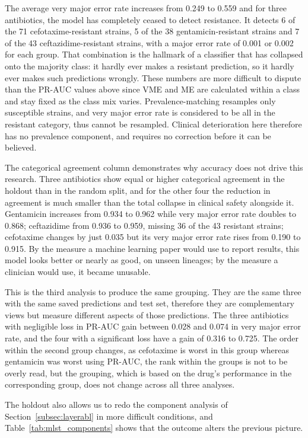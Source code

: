 The average very major error rate increases from 0.249 to 0.559 and for three
antibiotics, the model has completely ceased to detect resistance. It detects
6 of the 71 cefotaxime-resistant strains, 5 of the 38
gentamicin-resistant strains and 7 of the 43 ceftazidime-resistant strains, with a
major error rate of 0.001 or 0.002 for each group. That combination is the
hallmark of a classifier that has collapsed onto the
majority class: it hardly ever makes a resistant prediction, so it hardly ever
makes such predictions wrongly. These numbers are more difficult to dispute
than the PR-AUC values above since VME and ME are calculated within a class and
stay fixed as the class mix varies. Prevalence-matching resamples only
susceptible strains, and very major error rate is considered to be all in the
resistant category, thus cannot be resampled. Clinical deterioration here
therefore has no prevalence component, and requires no correction before it can
be believed.

The categorical agreement column demonstrates why accuracy does not drive this
research. Three antibiotics show equal or higher categorical agreement in the
holdout than in the random split, and for the other four the reduction in
agreement is much smaller than the total collapse in clinical safety alongside
it. Gentamicin increases from 0.934 to 0.962 while very major error rate doubles
to 0.868; ceftazidime from 0.936 to 0.959, missing 36 of the 43 resistant
strains; cefotaxime changes by just 0.035 but its very major error rate rises from
0.190 to 0.915. By the measure a machine learning paper would use to report
results, this model looks better or nearly as good, on unseen lineages; by the
measure a clinician would use, it became unusable.

This is the third analysis to produce the same grouping. They are the same three
with the same saved predictions and test set, therefore they are complementary
views but measure different aspects of those predictions. The three antibiotics
with negligible loss in PR-AUC gain between 0.028 and 0.074 in very major error
rate, and the four with a significant loss have a gain of 0.316 to 0.725. The
order within the second group changes, as cefotaxime is worst in this group
whereas gentamicin was worst using PR-AUC, the rank within the groups is not to be
overly read, but the grouping, which is based on the drug's performance in the
corresponding group, does not change across all three analyses.

The holdout also allows us to redo the component analysis of
Section~\ref{subsec:layerabl} in more difficult conditions, and
Table~\ref{tab:mlst_components} shows that the outcome alters the previous
picture.

